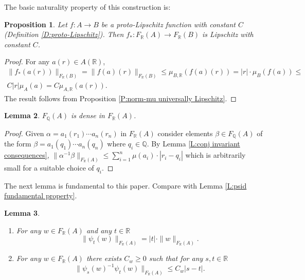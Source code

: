 \documentclass[12pt]{amsart}
\newtheorem{prop}{Proposition}[section]
\newtheorem{lemma}[prop]{Lemma}
\theoremstyle{definition}
\def\QQ{\ensuremath{\mathbb{Q}}}
\def\RR{\ensuremath{\mathbb{R}}}
\def\Free{F}
\begin{document}
The basic naturality property of this construction is:




\begin{prop}\label{P:naturality FRA} %
Let $f \colon A \to B$ be a proto-Lipschitz function with constant $C$ (Definition \ref{D:proto-Lipschitz}).
Then $f_*\colon \Free_\RR(A) \to \Free_\RR(B)$ is Lipschitz with constant $C$.
\end{prop}

\begin{proof}
For any $a(r) \in A(\RR)$, 
\begin{multline*}
\|f_*(a(r))\|_{\Free_\RR(B)} =
\|f(a)(r)\|_{\Free_\RR(B)} \leq
\mu_{B,\RR}(f(a)(r)) = 
|r| \cdot \mu_B(f(a)) \leq
\\
C |r| \mu_A(a) = C \mu_{A,\RR}(a(r)).
\end{multline*}
The result follows from Proposition \ref{P:norm-mu universally Lipschitz}.
\end{proof}




\begin{lemma}\label{L:FQA dense in FRA}
$\Free_\QQ(A)$ is dense in $\Free_\RR(A)$.
\end{lemma}

\begin{proof}
Given $\alpha=a_1(r_1) \cdots a_n(r_n)$ in $\Free_\RR(A)$ consider elements $\beta \in \Free_\QQ(A)$ of the form $\beta=a_1(q_1) \cdots a_n(q_n)$ where $q_i \in \QQ$.
By Lemma \ref{L:conj invariant consequences}, $\| \alpha^{-1}\beta\|_{\Free_\RR(A)} \leq \sum_{i=1}^n \mu(a_i) \cdot |r_i-q_i|$ which is arbitrarily small for a suitable choice of $q_i$.
\end{proof}





The next lemma is fundamental to this paper.
Compare with Lemma \ref{L:psid fundamental property}.



\begin{lemma}\label{L:psit FRA properties}
\hfill
\begin{enumerate}[label=(\alph*)]
\item
\label{L:psit FRA properties:multiplicative}
For any $w \in F_\RR(A)$ and any $t \in \RR$
\[
\|\psi_t(w)\|_{F_\RR(A)} = |t| \cdot \|w\|_{F_\RR(A)}.
\]

\item
\label{L:psit FRA properties:difference}
For any $w \in F_\RR(A)$ there exists $C_w \geq 0$ such that for any $s,t \in \RR$ 
\[
\| \psi_s(w)^{-1}\psi_t(w)\|_{F_\RR(A)} \leq C_w |s-t|.
\]
\end{enumerate}
\end{lemma}
\end{document}
